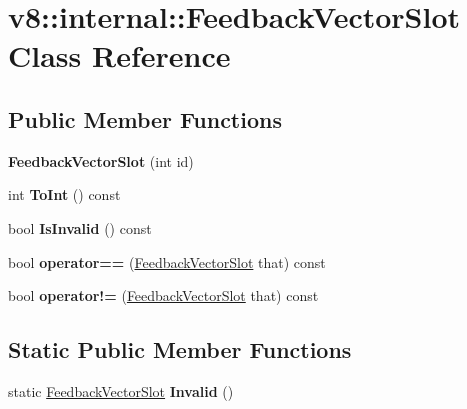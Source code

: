 \hypertarget{classv8_1_1internal_1_1_feedback_vector_slot}{}\section{v8\+:\+:internal\+:\+:Feedback\+Vector\+Slot Class Reference}
\label{classv8_1_1internal_1_1_feedback_vector_slot}
\subsection*{Public Member Functions}
\begin{DoxyCompactItemize}
\item 
{\bfseries Feedback\+Vector\+Slot} (int id)\hypertarget{classv8_1_1internal_1_1_feedback_vector_slot_a6e9c61d7f3831719fa65619da57125b6}{}\label{classv8_1_1internal_1_1_feedback_vector_slot_a6e9c61d7f3831719fa65619da57125b6}

\item 
int {\bfseries To\+Int} () const \hypertarget{classv8_1_1internal_1_1_feedback_vector_slot_ac264d487e6c7f09035700603ac950cb3}{}\label{classv8_1_1internal_1_1_feedback_vector_slot_ac264d487e6c7f09035700603ac950cb3}

\item 
bool {\bfseries Is\+Invalid} () const \hypertarget{classv8_1_1internal_1_1_feedback_vector_slot_af67b86d324e296ef0c00d5345148fba0}{}\label{classv8_1_1internal_1_1_feedback_vector_slot_af67b86d324e296ef0c00d5345148fba0}

\item 
bool {\bfseries operator==} (\hyperlink{classv8_1_1internal_1_1_feedback_vector_slot}{Feedback\+Vector\+Slot} that) const \hypertarget{classv8_1_1internal_1_1_feedback_vector_slot_a1a0c69e19960c1577706630968c6092f}{}\label{classv8_1_1internal_1_1_feedback_vector_slot_a1a0c69e19960c1577706630968c6092f}

\item 
bool {\bfseries operator!=} (\hyperlink{classv8_1_1internal_1_1_feedback_vector_slot}{Feedback\+Vector\+Slot} that) const \hypertarget{classv8_1_1internal_1_1_feedback_vector_slot_a491d3212c137c4d75b26475e04223c72}{}\label{classv8_1_1internal_1_1_feedback_vector_slot_a491d3212c137c4d75b26475e04223c72}

\end{DoxyCompactItemize}
\subsection*{Static Public Member Functions}
\begin{DoxyCompactItemize}
\item 
static \hyperlink{classv8_1_1internal_1_1_feedback_vector_slot}{Feedback\+Vector\+Slot} {\bfseries Invalid} ()\hypertarget{classv8_1_1internal_1_1_feedback_vector_slot_a2ec93adbe50ecf309b6886eceb33ae26}{}\label{classv8_1_1internal_1_1_feedback_vector_slot_a2ec93adbe50ecf309b6886eceb33ae26}

\end{DoxyCompactItemize}
